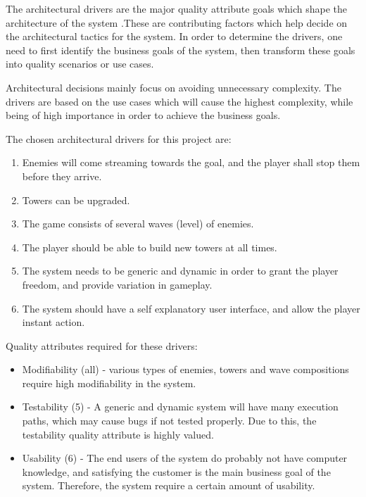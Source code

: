 \label{drivers} The architectural drivers are the major quality attribute goals which shape the architecture of the system \cite{bass2003software}.These are contributing factors which help decide on the architectural tactics for the system.  In order to determine the drivers, one need to first identify the business goals of the system, then transform these goals into quality scenarios or use cases. 

Architectural decisions mainly focus on avoiding unnecessary complexity. The drivers are based on the use cases which will cause the highest complexity, while being of high importance in order to achieve the business goals.

The chosen architectural drivers for this project are:
\begin{enumerate}
	\item Enemies will come streaming towards the goal, and the player shall stop them before they arrive.
	\item Towers can be upgraded.
	\item The game consists of several waves (level) of enemies.
	\item The player should be able to build new towers at all times.
	\item The system needs to be generic and dynamic in order to grant the player freedom, and provide variation in gameplay.
	\item The system should have a self explanatory user interface, and allow the player instant action.
\end{enumerate}

Quality attributes required for these drivers:

\begin{itemize}
	\item Modifiability (all) - various types of enemies, towers and wave compositions require high modifiability in the system.
	\item Testability (5) - A generic and dynamic system will have many execution paths, which may cause bugs if not tested properly. Due to this, the testability quality attribute is highly valued.  
	\item Usability (6) - The end users of the system do probably not have computer knowledge, and satisfying the customer is the main business goal of the system. Therefore, the system require a certain amount of usability.
\end{itemize}
